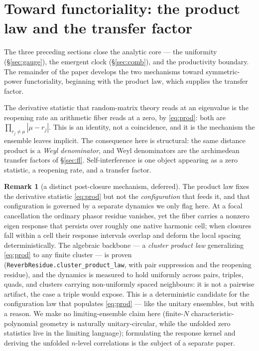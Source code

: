 \documentclass[11pt]{article}
\theoremstyle{definition}
\newtheorem{remark}[theorem]{Remark}
\begin{document}
\section{Toward functoriality: the product law and the transfer factor}\label{sec:gue}

The three preceding sections close the analytic core --- the uniformity (\S\ref{sec:gauge}), the
emergent clock (\S\ref{sec:comb}), and the productivity boundary. The remainder of the paper develops
the two mechanisms toward symmetric-power functoriality, beginning with the product law, which supplies
the transfer factor.

The derivative statistic that random-matrix theory reads at an eigenvalue is the reopening rate an
arithmetic fiber reads at a zero, by \eqref{eq:prod}: both are $\prod_{r_j\neq\mu}|\mu-r_j|$. This is
an identity, not a coincidence, and it is the mechanism the ensemble leaves implicit. The consequence
here is structural: the same distance product is a \emph{Weyl denominator}, and Weyl denominators are
the archimedean transfer factors of \S\ref{sec:fl}. Self-interference is one object appearing as a
zero statistic, a reopening rate, and a transfer factor.

\begin{remark}[a distinct post-closure mechanism, deferred]
The product law fixes the derivative statistic \eqref{eq:prod} but not the \emph{configuration} that
feeds it, and that configuration is governed by a separate dynamics we only flag here. At a focal
cancellation the ordinary phasor residue vanishes, yet the fiber carries a nonzero eigen response that
persists over roughly one native harmonic cell; when closures fall within a cell their response
intervals overlap and deform the local spacing deterministically. The algebraic backbone --- a
\emph{cluster product law} generalizing \eqref{eq:prod} to any finite cluster --- is proven
(\texttt{ReverbResidue.cluster\_product\_law}, with pair suppression and the reopening residue), and
the dynamics is measured to hold uniformly across pairs, triples, quads, and clusters carrying
non-uniformly spaced neighbours: it is not a pairwise artifact, the case a triple would expose. This is
a deterministic candidate for the configuration law that populates \eqref{eq:prod} --- like the
unitary ensembles, but with a reason. We make no limiting-ensemble claim here (finite-$N$
characteristic-polynomial geometry is naturally unitary-circular, while the unfolded zero statistics
live in the limiting language); formulating the response kernel and deriving the unfolded $n$-level
correlations is the subject of a separate paper.
\end{remark}
\end{document}
